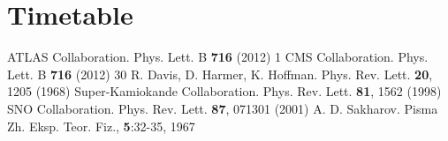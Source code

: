\documentclass[12pt,a4paper]{article}
\begin{document}
\section{Timetable}


\begin{thebibliography}{8}
ATLAS Collaboration. Phys. Lett. B \textbf{716} (2012) 1
CMS Collaboration. Phys. Lett. B \textbf{716} (2012) 30
R. Davis, D. Harmer, K. Hoffman. Phys. Rev. Lett. \textbf{20}, 1205 (1968)
 Super-Kamiokande Collaboration. Phys. Rev. Lett. \textbf{81}, 1562 (1998)
SNO Collaboration. Phys. Rev. Lett. \textbf{87}, 071301 (2001)
A. D. Sakharov. Pisma Zh. Eksp. Teor. Fiz., \textbf{5}:32-35, 1967

\end{thebibliography}
\end{document}
